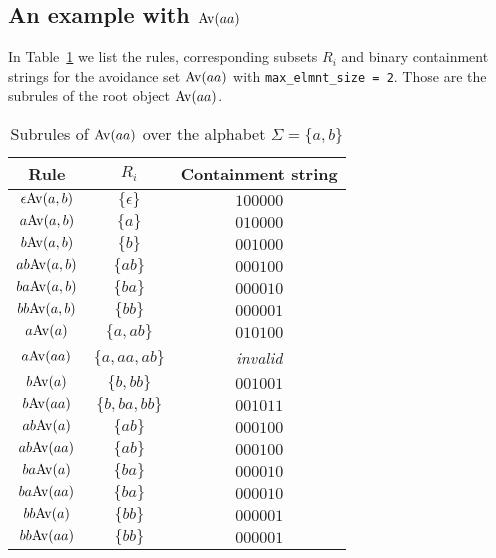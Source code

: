 \subsection{An example with ${\mathrm{Av}\!\left(aa\right)}$}

In Table~\ref{table:subrules of Av(aa)} we list the rules, corresponding subsets 
$R_i$ and binary containment strings for the avoidance set ${\mathrm{Av}\!\left(aa\right)}$ with 
\texttt{max\_elmnt\_size = 2}. Those are the subrules of the root object 
${\mathrm{Av}\!\left(aa\right)}$.

{\renewcommand{\arraystretch}{1.5}
\begin{table}[ht]
    \centering
    \begin{tabular}{ c | c | c }
        Rule & $R_i$ & Containment string \\
        \hline\hline
        $\epsilon {\mathrm{Av}\!\left(a,b\right)}$ & $\{ \epsilon \}$ & $100000$ \\
        $a {\mathrm{Av}\!\left(a,b\right)}$ & $\{ a \}$ & $010000$ \\
        $b {\mathrm{Av}\!\left(a,b\right)}$ & $\{ b \}$ & $001000$ \\
        $ab {\mathrm{Av}\!\left(a,b\right)}$ & $\{ ab \}$ & $000100$ \\
        $ba {\mathrm{Av}\!\left(a,b\right)}$ & $\{ ba \}$ & $000010$ \\
        $bb {\mathrm{Av}\!\left(a,b\right)}$ & $\{ bb \}$ & $000001$ \\
        $a {\mathrm{Av}\!\left(a\right)}$ & $\{ a, ab \}$ & $010100$ \\
        $a {\mathrm{Av}\!\left(aa\right)}$ & $\{ a, aa, ab \}$ & \emph{invalid} \\
        $b {\mathrm{Av}\!\left(a\right)}$ & $\{ b, bb \}$ & $001001$ \\
        $b {\mathrm{Av}\!\left(aa\right)}$ & $\{ b, ba, bb \}$ & $001011$ \\
        $ab {\mathrm{Av}\!\left(a\right)}$ & $\{ ab \}$ & $000100$ \\
        $ab {\mathrm{Av}\!\left(aa\right)}$ & $\{ ab \}$ & $000100$ \\
        $ba {\mathrm{Av}\!\left(a\right)}$ & $\{ ba \}$ & $000010$ \\
        $ba {\mathrm{Av}\!\left(aa\right)}$ & $\{ ba \}$ & $000010$ \\
        $bb {\mathrm{Av}\!\left(a\right)}$ & $\{ bb \}$ & $000001$ \\
        $bb {\mathrm{Av}\!\left(aa\right)}$ & $\{ bb \}$ & $000001$ \\
    \hline \hline
    \end{tabular}
    \caption{Subrules of ${\mathrm{Av}\!\left(aa\right)}$ over the alphabet $\Sigma = \{a, b\}$}
    \label{table:subrules of Av(aa)}
\end{table}}

